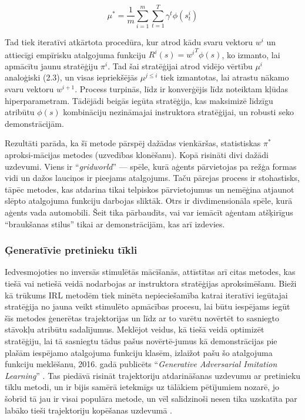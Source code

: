 \documentclass[12pt, a4paper]{article}
\numberwithin{equation}{section} %
\begin{document}
\begin{equation}
    \mu^* = \frac{1}{m}\sum_{i=1}^m\sum_{t=1}^T \gamma^t \phi(s^i_t)
\end{equation}

Tad tiek iteratīvi atkārtota procedūra, kur atrod kādu svaru vektoru $w^{i}$ un attiecīgi empīrisku atalgojuma funkciju $R^{i}(s) = {w^{i}}^T\phi(s)$, ko izmanto, lai apmācītu jaunu stratēģiju $\pi^i$. Tad šai stratēģijai atrod vidējo vērtību $\mu^i$ analoģiski (2.3), un visas iepriekšējās $\mu^{j \leq i}$ tiek izmantotas, lai atrastu nākamo svaru vektoru $w^{i+1}$. Process turpinās, līdz ir konverģējis līdz noteiktam kļūdas hiperparametram. Tādējādi beigās iegūta stratēģija, kas maksimizē līdzīgu atribūtu $\phi(s)$ kombināciju nezināmajai instruktora stratēģijai, un robusti seko demonstrācijām.

Rezultāti parāda, ka šī metode pārspēj dažādas vienkāršas, statistiskas $\pi^*$ aproksi-mācijas metodes (uzvedības klonēšanu). Kopā risināti divi dažādi uzdevumi. Viens ir ``\textit{gridworld}'' --- spēle, kurā aģents pārvietojas pa režģa formas vidi un dažos lauciņos ir pieejams atalgojums. Taču pārejas process ir stohastisks, tāpēc metodes, kas atdarina tikai telpiskos pārvietojumus un nemēģina atjaunot slēpto atalgojuma funkciju darbojas sliktāk. Otrs ir divdimensionāla spēle, kurā aģents vada automobili. Šeit tika pārbaudīts, vai var iemācīt aģentam atšķirīgus ``braukšanas stilus'' tikai ar demonstrācijām, kas arī izdevies.

\subsubsection{Ģeneratīvie pretinieku tīkli}

Iedvesmojoties no inversās stimulētās mācīšanās, attīstītas arī citas metodes, kas tiešā vai netiešā veidā nodarbojas ar instruktora stratēģijas aproksimēšanu. Bieži kā trūkums IRL metodēm tiek minēta nepieciešamība katrai iteratīvi iegūtajai stratēģija no jauna veikt stimulēto apmācības procesu, lai būtu iespējams iegūt šīs metodes ģenerētas trajektorijas un līdz ar to varētu novērtēt to sasniegto stāvokļu atribūtu sadalījumus. Meklējot veidus, kā tiešā veidā optimizēt stratēģiju, lai tā sasniegtu tādus pašus novērtē-jumus kā demonstrācijas pie plašām iespējamo atalgojuma funkciju klasēm, izlaižot pašu šo atalgojuma funkciju meklēšanu, 2016. gadā publicēts ``\textit{Generative Adversarial Imitation Learning}'' \cite{ho2016generative}. Tas piedāvā risināt trajektoriju atdarināšanas uzdevumu ar pretinieku tīklu metodi, un ir bijis samērā ietekmīgs uz tālākiem pētījumiem nozarē, jo šobrīd tā jau ir visai populāra metode, un vēl salīdzinoši nesen tika uzskatīta par labāko tieši trajektoriju kopēšanas uzdevumā \cite{torabi2018generative}.
\end{document}
